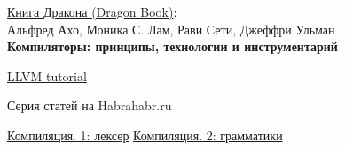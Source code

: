 \begin{thebibliography}{99}
\href{https://drive.google.com/file/d/0B0u4WeMjO894LS1Jb3JUbEVSVkE/view?usp=sharing}{Книга Дракона (Dragon Book)}:\\
Альфред Ахо, Моника С. Лам, Рави Сети, Джеффри Ульман\\
\textbf{Компиляторы: принципы, технологии и инструментарий}

 \href{http://llvm.org/docs/tutorial/}{LLVM tutorial}

Серия статей на Habrahabr.ru

 \href{http://habrahabr.ru/post/99162/}{Компиляция. 1: лексер}
 \href{http://habrahabr.ru/post/99298/}{Компиляция. 2: грамматики}
\end{thebibliography}